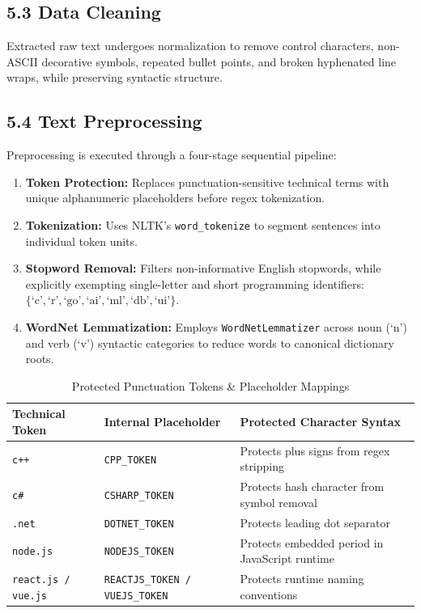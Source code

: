 \documentclass[11pt,a4paper]{article}
\begin{document}
\subsection{5.3 Data Cleaning}
Extracted raw text undergoes normalization to remove control characters, non-ASCII decorative symbols, repeated bullet points, and broken hyphenated line wraps, while preserving syntactic structure.

\subsection{5.4 Text Preprocessing}
Preprocessing is executed through a four-stage sequential pipeline:
\begin{enumerate}[noitemsep]
    \item \textbf{Token Protection:} Replaces punctuation-sensitive technical terms with unique alphanumeric placeholders before regex tokenization.
    \item \textbf{Tokenization:} Uses NLTK's \texttt{word\_tokenize} to segment sentences into individual token units.
    \item \textbf{Stopword Removal:} Filters non-informative English stopwords, while explicitly exempting single-letter and short programming identifiers: $\{\text{`c'}, \text{`r'}, \text{`go'}, \text{`ai'}, \text{`ml'}, \text{`db'}, \text{`ui'}\}$.
    \item \textbf{WordNet Lemmatization:} Employs \texttt{WordNetLemmatizer} across noun (`n') and verb (`v') syntactic categories to reduce words to canonical dictionary roots.
\end{enumerate}

\begin{table}[h!]
\centering
\small
\begin{tabular}{lll}
\toprule
\textbf{Technical Token} & \textbf{Internal Placeholder} & \textbf{Protected Character Syntax} \\
\midrule
\texttt{c++} & \texttt{CPP\_TOKEN} & Protects plus signs from regex stripping \\
\texttt{c\#} & \texttt{CSHARP\_TOKEN} & Protects hash character from symbol removal \\
\texttt{.net} & \texttt{DOTNET\_TOKEN} & Protects leading dot separator \\
\texttt{node.js} & \texttt{NODEJS\_TOKEN} & Protects embedded period in JavaScript runtime \\
\texttt{react.js / vue.js} & \texttt{REACTJS\_TOKEN / VUEJS\_TOKEN} & Protects runtime naming conventions \\
\bottomrule
\end{tabular}
\caption{Protected Punctuation Tokens \& Placeholder Mappings}
\end{table}
\end{document}
